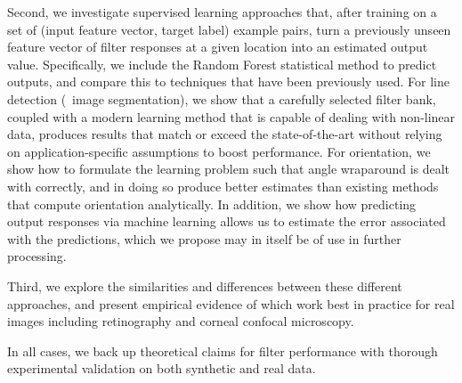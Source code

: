 Second, we investigate supervised learning approaches that, after training on a set of (input feature vector, target label) example pairs, turn a previously unseen feature vector of filter responses at a given location into an estimated output value. Specifically, we include the Random Forest statistical method to predict outputs, and compare this to techniques that have been previously used. For line detection (\ie~image segmentation), we show that a carefully selected filter bank, coupled with a modern learning method that is capable of dealing with non-linear data, produces results that match or exceed the state-of-the-art without relying on application-specific assumptions to boost performance. For orientation, we show how to formulate the learning problem such that angle wraparound is dealt with correctly, and in doing so produce  better estimates than existing methods that compute orientation analytically. In addition, we show how predicting output responses via machine learning allows us to estimate the error associated with the predictions, which we propose may in itself be of use in further processing.

Third, we explore the similarities and differences between these different approaches, and present empirical evidence of which work best in practice for real images including retinography and corneal confocal microscopy.

In all cases, we back up theoretical claims for filter performance with thorough experimental validation on both synthetic and real data.